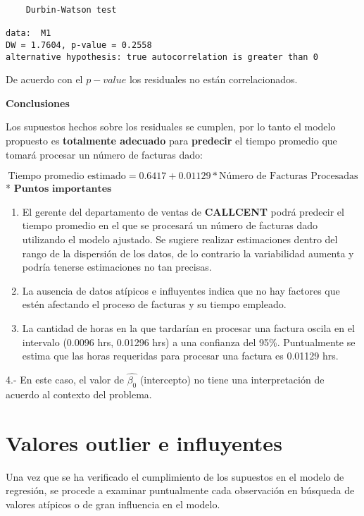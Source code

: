 \documentclass[
  a4paper,
  oneside,
  openany]{book}
\begin{document}
\begin{verbatim}
    Durbin-Watson test

data:  M1
DW = 1.7604, p-value = 0.2558
alternative hypothesis: true autocorrelation is greater than 0
\end{verbatim}

De acuerdo con el \(p-value\) los residuales no están correlacionados.

\textbf{Conclusiones}

Los supuestos hechos sobre los residuales se cumplen, por lo tanto el modelo propuesto es \textbf{totalmente adecuado} para \textbf{predecir} el tiempo promedio que tomará procesar un número de facturas dado:

\[\mbox{Tiempo promedio estimado}=0.6417+0.01129* \mbox{Número de Facturas Procesadas} \]
* \(\textbf{Puntos importantes}\)

\begin{enumerate}
\def\labelenumi{\arabic{enumi}.}
\item
  El gerente del departamento de ventas de \textbf{CALLCENT} podrá predecir el tiempo promedio en el que se procesará un número de facturas dado utilizando el modelo ajustado. Se sugiere realizar estimaciones dentro del rango de la dispersión de los datos, de lo contrario la variabilidad aumenta y podría tenerse estimaciones no tan precisas.
\item
  La ausencia de datos atípicos e influyentes indica que no hay factores que estén afectando el proceso de facturas y su tiempo empleado.
\item
  La cantidad de horas en la que tardarían en procesar una factura oscila en el intervalo (0.0096 hrs, 0.01296 hrs) a una confianza del 95\%. Puntualmente se estima que las horas requeridas para procesar una factura es 0.01129 hrs.
\end{enumerate}

4.- En este caso, el valor de \(\hat{\beta_{0}}\) (intercepto) no tiene una interpretación de acuerdo al contexto del problema.

\hypertarget{valores-outlier-e-influyentes}{%
\section{Valores outlier e influyentes}\label{valores-outlier-e-influyentes}}

Una vez que se ha verificado el cumplimiento de los supuestos en el modelo de regresión, se procede a examinar puntualmente cada observación en búsqueda de valores atípicos o de gran influencia en el modelo.
\end{document}
